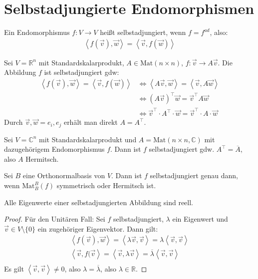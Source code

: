 \documentclass{report}
\newcommand{\bC}{\mathbb{C}}
\newcommand{\bR}{\mathbb{R}}
\newcommand{\vv}{\vec{v}}
\newcommand{\vw}{\vec{w}}
\newcommand{\Mat}[3]{\text{Mat}^{#1}_{#2}\left(#3\right)}
\newcommand{\Matnn}{\text{Mat}(n \times n)}
\newcommand{\scalar}[2]{\left\langle #1, #2 \right\rangle}
\begin{document}
\section{Selbstadjungierte Endomorphismen}
\begin{definition}
 Ein Endomorphismus $f : V \to V$ heißt selbstadjungiert, wenn $f = f^{ad}$, also:
 \begin{align*}
  \scalar{f(\vv)}{\vw} = \scalar{\vv}{f(\vw)}
 \end{align*}
\end{definition}
\begin{beispiel}
 Sei $V = \bR^n$ mit Standardskalarprodukt, $A \in \Matnn$, $f : \vv \to A \vv$. Die Abbildung $f$ ist selbstadjungiert gdw:
 \begin{align*}
  \scalar{f(\vv)}{\vw} = \scalar{\vv}{f(\vw)}
  &\Leftrightarrow \scalar{A\vv}{\vw} = \scalar{\vv}{A \vw}\\
  &\Leftrightarrow (A\vv)^\top \vw = \vv^\top A \vw\\
  &\Leftrightarrow \vv^\top \cdot A^\top \cdot \vw = \vv^\top \cdot A \cdot \vw
 \end{align*}
 Durch $\vv, \vw = e_i, e_j$ erhält man direkt $A = A^\top$.
\end{beispiel}
\begin{beispiel}
 Sei $V = \bC^n$ mit Standardskalarprodukt und $A = \text{Mat}(n \times n, \bC)$ mit dazugehörigem Endomorphismus $f$. Dann ist $f$ selbstadjungiert gdw. $A^\top = \overline{A}$, also $A$ Hermitsch.
\end{beispiel}
\begin{proposition}
Sei $B$ eine Orthonormalbasis von $V$. Dann ist $f$ selbstadjungiert genau dann, wenn $\Mat{B}{B}{f}$ symmetrisch oder Hermitsch ist.
\end{proposition}
\begin{theorem}
 Alle Eigenwerte einer selbstadjungierten Abbildung sind reell.
\end{theorem}
\begin{proof}
 Für den Unitären Fall: Sei $f$ selbstadjungiert, $\lambda$ ein Eigenwert und $\vv \in V \setminus \{0\}$ ein zugehöriger Eigenvektor. Dann gilt:
 \begin{align*}
  \scalar{f(\vv)}{\vw} = \scalar{\lambda \vv}{\vv} = \lambda \scalar{\vv}{\vv}\\
  \scalar{\vv}{f(\vv} = \scalar{\vv}{\lambda \vv} = \overline{\lambda} \scalar{\vv}{\vv}\\
 \end{align*}
 Es gilt $\scalar{\vv}{\vv} \neq 0$, also $\lambda = \overline{\lambda}$, also $\lambda \in \bR$.
\end{proof}
\end{document}
